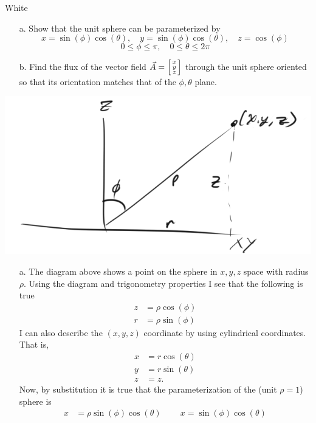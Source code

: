 \documentclass[titlepage]{article}
\begin{document}
\begin{cproblem}{3}{White}
\phantom{-}
\begin{itemize}
\item[a.] 
Show that the unit sphere can be parameterized by 
$$ x = \sin(\phi)\cos(\theta), \quad y = \sin(\phi)\cos(\theta), \quad z = \cos(\phi)$$
$$ 0\leq\phi\leq \pi, \quad 0\leq\theta\leq 2\pi $$
\item[b.]
Find the flux of the vector field $\vec{A} = \left[\begin{smallmatrix}x \\ y \\ z\end{smallmatrix}\right]$ through the unit sphere oriented so that its orientation matches that of the $\phi, \theta$ plane.
\end{itemize}
\end{cproblem}
\begin{solution}\begin{center}\includegraphics[scale=.5]{sphere.png}\end{center}
\begin{itemize}
\item[a.] The diagram above shows a point on the sphere in $x,y,z$ space with radius $\rho$. Using the diagram and trigonometry properties I see that the following is true
\begin{align*}
z &= \rho\cos(\phi) \\
r &= \rho\sin(\phi) 
\end{align*}
I can also describe the $(x,y,z)$ coordinate by using cylindrical coordinates. That is,
\begin{align*}
x &= r\cos(\theta) \\
y &= r\sin(\theta) \\
z &= z.
\end{align*}
Now, by substitution it is true that the parameterization of the (unit $\rho = 1$) sphere  is
\begin{align*}
x &= \rho\sin(\phi)\cos(\theta) \phantom{\implies} \ x  = \sin(\phi)\cos(\theta)\\

\end{align*}
\end{itemize}
\end{solution}
\end{document}
